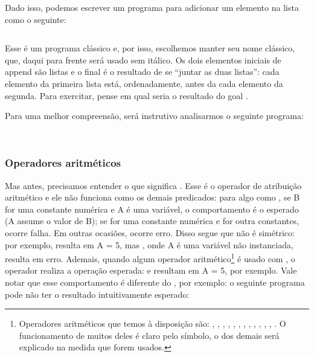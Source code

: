 Dado isso, podemos escrever um programa para adicionar um elemento na lista como o seguinte:

\begin{listing}[ht]
\inputminted{prolog}{../Exemplos/Cap2/prog2_append.pl}\label{lst:append}
\end{listing}

Esse é um programa clássico e, por isso, escolhemos manter seu nome clássico, que, daqui para frente será usado sem itálico. Os dois elementos iniciais de append são listas e o final é o resultado de se ``juntar as duas listas'': cada elemento da primeira lista está, ordenadamente, antes da cada elemento da segunda. Para exercitar, pense em qual seria o resultado do goal .

Para uma melhor compreensão, será instrutivo analisarmos o seguinte programa:
\\
\\

\inputminted{prolog}{../Exemplos/Cap3/prog2_length.pl}\label{lst:length}

\subsubsection{Operadores aritméticos}

Mas antes, precisamos entender o que significa . Esse  é o operador de atribuição aritmético e ele não funciona como os demais predicados: para algo como , se B for uma constante numérica e A é uma variável, o comportamento é o esperado (A assume o valor de B); se  for uma constante numérica e  for outra constantes, ocorre falha. Em outras ocasiões, ocorre erro.
Disso segue que  não é simétrico: por exemplo,  resulta em A = 5, mas ,
onde A é uma variável não instanciada, resulta em erro. Ademais, quando algum
operador aritmético\footnote{Operadores aritméticos que temos à disposição são: ,
  , , , , , ,
  , , , , , . O
  funcionamento de muitos deles é claro pelo símbolo, o dos demais será explicado na medida que
  forem usados.}  é usado com , o operador realiza a operação esperada:
 e  resultam em A = 5, por exemplo. Vale notar que esse
comportamento é diferente do , por exemplo: o seguinte
programa pode não ter o resultado intuitivamente esperado:

